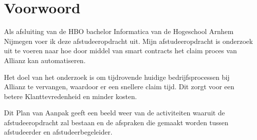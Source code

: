 \chapter{Voorwoord}
Als afsluiting van de HBO bachelor Informatica van de Hogeschool Arnhem Nijmegen voer ik deze afstudeeropdracht uit. Mijn afstudeeropdracht is onderzoek uit te voeren naar hoe door middel van smart contracts het claim proces van Allianz kan automatiseren.\par
Het doel van het onderzoek is om tijdrovende huidige bedrijfsprocessen bij Allianz te vervangen, waardoor er een snellere claim tijd. Dit zorgt voor een betere Klanttevredenheid en minder kosten.\par
Dit Plan van Aanpak geeft een beeld weer van de activiteiten waaruit de afstudeeropdracht zal bestaan en de afspraken die gemaakt worden tussen afstudeerder en afstudeerbegeleider.